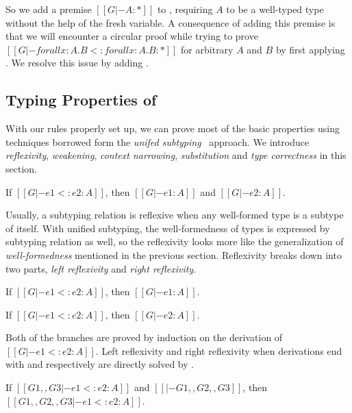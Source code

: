 So we add a premise $[[G |- A : *]]$ to ,
requiring $A$ to be a well-typed type without the help of the fresh variable.
A consequence of adding this premise is that we will encounter a circular proof
while trying to prove $[[G |- forall x : A. B <: forall x : A . B : *]]$ for
arbitrary $A$ and $B$ by first applying . We resolve this issue by
adding .

\subsection{Typing Properties of \name}

With our rules properly set up, we can prove most of the basic properties
using techniques borrowed form the \emph{unifed subtyping}~\cite{yang2017unifying} approach.
We introduce \emph{reflexivity}, \emph{weakening},
\emph{context narrowing}, \emph{substitution} and \emph{type correctness}
in this section.

\begin{theorem}[Reflexivity]
   If $[[G |- e1 <: e2 : A]]$,
   then $[[G |- e1 : A]]$ and $[[G |- e2 : A]]$.
\end{theorem}

Usually, a subtyping relation is reflexive when any well-formed type is a subtype
of itself. With unified subtyping, the well-formedness of types is expressed by
subtyping relation as well, so the reflexivity looks more like the generalization
of \emph{well-formedness} mentioned in the previous section. Reflexivity
breaks down into two parts, \emph{left reflexivity} and \emph{right reflexivity}.

\begin{lemma}
   If $[[G |- e1 <: e2 : A]]$,
   then $[[G |- e1 : A]]$.
\end{lemma}

\begin{lemma}
   If $[[G |- e1 <: e2 : A]]$,
   then $[[G |- e2 : A]]$.
\end{lemma}

\noindent Both of the branches are proved by induction on the derivation of
$[[G |- e1 <: e2 : A]]$.
Left reflexivity and right reflexivity when derivations end with 
and  respectively are directly solved by .

\begin{theorem}[Weakening]
    If $[[G1 ,, G3 |- e1 <: e2 : A]]$ and $[[|- G1 ,, G2 ,, G3]]$,
    then $[[G1 ,, G2 ,, G3 |- e1 <: e2 : A]]$.
\end{theorem}

